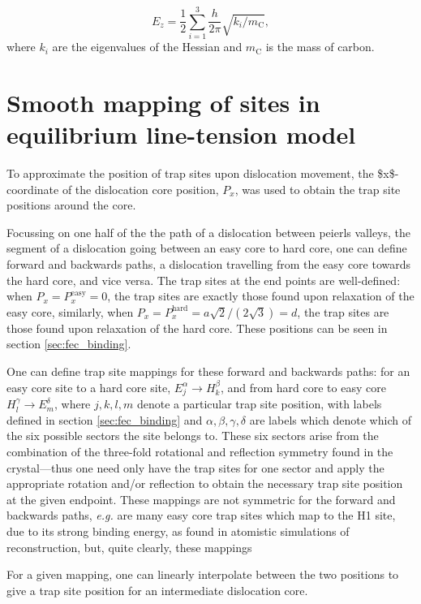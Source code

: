 \documentclass[a4paper,12pt,oneside,print,numbered,index,PageStyleIII]{PhDThesisPSnPDF}
\begin{document}
\begin{appendices}
\[ E_z = \frac{1}{2} \sum_{i=1}^3 \frac{h}{2\pi} \sqrt{ k_i /
  m_{\text{C}} },  \]
where \(k_i\) are the eigenvalues of the Hessian and \(m_\text{C}\) is
the mass of carbon.

\chapter{Smooth mapping of sites in equilibrium line-tension model}
\label{sec:org3d1b800}
\label{sec:smoothsitemapping}

To approximate the position of trap sites upon dislocation movement, the
\$x\$-coordinate of the dislocation core position, \(P_x\), was used to obtain the trap
site positions around the core.

Focussing on one half of the the path of a dislocation between peierls
valleys, the segment of a dislocation going between an easy core to hard
core, one can define forward and backwards paths, a dislocation travelling
from the easy core towards the hard core, and vice versa. The trap sites at
the end points are well-defined: when \(P_x = P_x^{\text{easy}} = 0\), the trap
sites are exactly those found upon relaxation of the easy core, similarly,
when \(P_x = P_x^{\text{hard}} = a\sqrt{2} / (2\sqrt{3}) = d\), the trap sites are
those found upon relaxation of the hard core. These positions can be seen in
section \ref{sec:fec_binding}.

One can define trap site mappings for these forward and backwards paths: for an easy
core site to a hard core site, \(E_j^{\alpha} \rightarrow H_k^{\beta}\), and
from hard core to easy core \(H_l^{\gamma} \rightarrow E_m^{\delta}\), where
\(j,k,l,m\) denote a particular trap site position, with labels defined in section \ref{sec:fec_binding} and
\(\alpha,\beta,\gamma,\delta\) are labels which denote which of the six possible sectors the
site belongs to. These six sectors arise from the combination of the
three-fold rotational and reflection symmetry found in the crystal---thus one
need only have the trap sites for one sector and apply the appropriate rotation and/or
reflection to obtain the necessary trap site position at the given endpoint. These mappings are not
symmetric for the forward and backwards paths, \emph{e.g.} are many easy core trap
sites which map to the H1 site, due to its strong binding energy, as found in
atomistic simulations of reconstruction, but, quite clearly, these mappings


For a given mapping, one can linearly interpolate between the two positions to give a trap site position for an
intermediate dislocation core.


\end{appendices}
\end{document}
